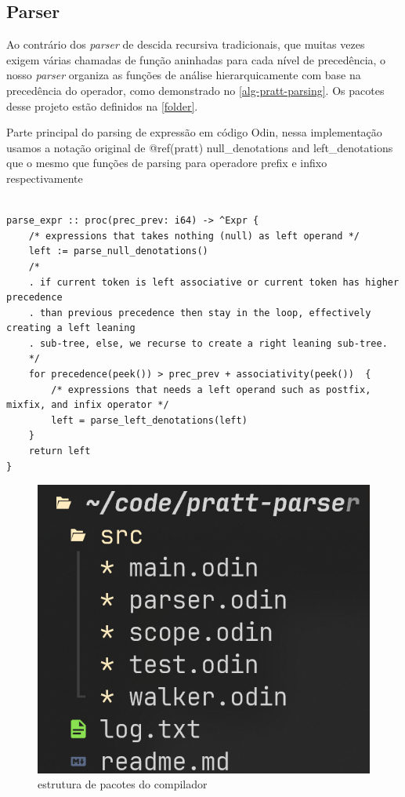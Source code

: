 \documentclass[english, 
               brazil, 
               bsc] %
               {dcomp-abntex2}
\begin{document}
\subsection{Parser}

Ao contrário dos \textit{parser} de descida recursiva tradicionais, que muitas vezes exigem várias chamadas de função aninhadas para cada nível de precedência, o nosso \textit{parser} organiza as funções de análise hierarquicamente com base na precedência do operador, como demonstrado no \autoref{alg-pratt-parsing}. Os pacotes desse projeto estão definidos na \autoref{folder}.


\begin{algoritmo}[H]
  \caption{Parte principal do parsing de expressão em código Odin, nessa implementação usamos a notação original de @ref(pratt) null\_denotations and left\_denotations que o mesmo que funções de parsing para operadore prefix e infixo respectivamente}
	\label{alg-pratt-parsing}
  \begin{lstlisting}

parse_expr :: proc(prec_prev: i64) -> ^Expr {
    /* expressions that takes nothing (null) as left operand */
    left := parse_null_denotations() 
    /*
    . if current token is left associative or current token has higher precedence
    . than previous precedence then stay in the loop, effectively creating a left leaning
    . sub-tree, else, we recurse to create a right leaning sub-tree.
    */
    for precedence(peek()) > prec_prev + associativity(peek())  {
        /* expressions that needs a left operand such as postfix, mixfix, and infix operator */
        left = parse_left_denotations(left)
    }
    return left
}

  \end{lstlisting}
\end{algoritmo}


\begin{figure}[H]
	\caption{\label{folder} \small estrutura de pacotes do compilador}
	\begin{center}
	    \includegraphics[scale=0.5]{./Imagens/folder_structuer_odin_parser_lexer.png}
	\end{center}
\end{figure}
\end{document}
